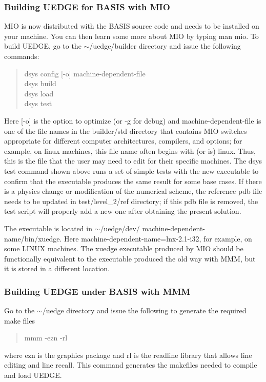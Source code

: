 \documentclass [12pt]{article}
\def\tild{$\sim$}
\begin{document}
\subsubsection{Building {\sf UEDGE} for {\sf BASIS} with {\sf MIO}}
%
{\sf MIO} is now distributed with the {\sf BASIS} source code and needs to be
installed on your machine.  You can then learn some more about {\sf MIO} by
typing {\sf man mio}.  To build {\sf UEDGE}, go to the \tild/uedge/builder
directory and issue the following commands:
\begin{verse} \sf
   dsys config [-o] {\sf machine-dependent-file} \\
   dsys build \\
   dsys load \\
   dsys test 
\end{verse}
Here [-o] is the option to optimize (or -g for debug) and {\sf
  machine-dependent-file} is one of the file names in the builder/std
directory that contains {\sf MIO} switches appropriate for different computer
architectures, compilers, and options; for example, on {\sf linux} machines,
this file name often begins with (or is) {\sf linux}.  Thus, this is the file
that the user may need to edit for their specific machines.  The {\sf dsys
  test} command shown above runs a set of simple tests with the new executable
to confirm that the executable produces the same result for some base cases.
If there is a physics change or modification of the numerical scheme, the
reference pdb file needs to be updated in test/level\_2/ref directory; if this
pdb file is removed, the test script will properly add a new one after
obtaining the present solution.

The executable is located in \tild/uedge/dev/{\sf
  machine-dependent-name}/bin/xuedge.  Here {\sf
  machine-dependent-name}=lnx-2.1-i32, for example, on some LINUX machines.
The xuedge executable produced by {\sf MIO} should be functionally equivalent
to the executable produced the old way with {\sf MMM}, but it is stored in
a different location.

\subsubsection{Building {\sf UEDGE} under BASIS with {\sf MMM}}
%
Go to the \tild/uedge directory and issue the following to 
                                       generate the required make files 
\begin{verse} \sf
   mmm -ezn -rl 
\end{verse}
where ezn is the graphics package and rl is the readline library that
allows line editing and line recall. This command generates the makefiles
needed to compile and load {\sf UEDGE}.
\end{document}
